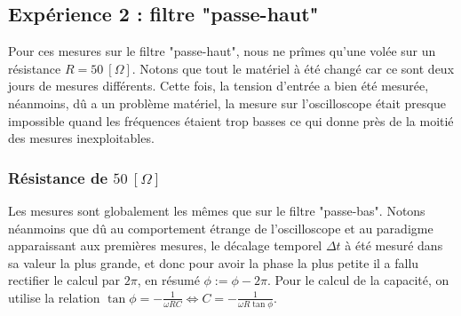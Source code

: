 \subsection{Expérience 2 : filtre "passe-haut"}

Pour ces mesures sur le filtre "passe-haut", nous ne prîmes qu'une volée sur un résistance $R= 50 \ [\Omega]$. Notons que tout le matériel à été changé car ce sont deux jours de mesures différents. Cette fois, la tension d'entrée a bien été mesurée, néanmoins, dû a un problème matériel, la mesure sur l'oscilloscope était presque impossible quand les fréquences étaient trop basses ce qui donne près de la moitié des mesures inexploitables.

\subsubsection{Résistance de \texorpdfstring{$ 50 \ [ \Omega ] $}{TEXT}}

Les mesures sont globalement les mêmes que sur le filtre "passe-bas". Notons néanmoins que dû au comportement étrange de l'oscilloscope et au paradigme apparaissant aux premières mesures, le décalage temporel $\Delta t$ à été mesuré dans sa valeur la plus grande, et donc pour avoir la phase la plus petite il a fallu rectifier le calcul par $2\pi$, en résumé $\phi := \phi - 2\pi$. Pour le calcul de la capacité, on utilise la relation $\tan \phi = - \frac{1}{\omega R C} \Leftrightarrow C = - \frac{1}{\omega R \tan \phi}$.

